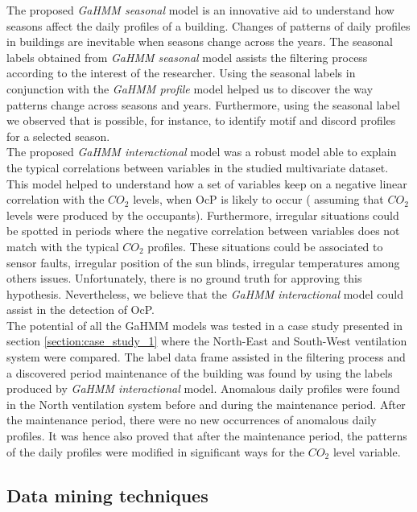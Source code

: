 The proposed \textit{GaHMM seasonal} model is an innovative aid to understand how seasons affect the daily profiles of a building. Changes of patterns of daily profiles in buildings are inevitable when seasons change across the years. The seasonal labels obtained from \textit{GaHMM seasonal} model assists the filtering process according to the interest of the researcher. Using the seasonal labels in conjunction with the \textit{GaHMM profile} model helped us to discover the way patterns change across seasons and years. Furthermore, using the seasonal label we observed that is possible, for instance, to identify motif and discord profiles for a selected season.  \\

The proposed \textit{GaHMM interactional} model was a robust model able to explain the typical correlations between variables in the studied multivariate dataset. This model helped to understand how a set of variables keep on a negative linear correlation with the $CO_2$ levels, when OcP is likely to occur ( assuming that $CO_2$ levels were produced by the occupants). Furthermore, irregular situations could be spotted in periods where the negative correlation between variables does not match with the typical $CO_2$ profiles. These situations could be associated to sensor faults, irregular position of the sun blinds, irregular temperatures among others issues. Unfortunately, there is no ground truth for approving this hypothesis. Nevertheless, we believe that the \textit{GaHMM interactional} model could assist in the detection of OcP.   \\ 

The potential of all the GaHMM models was tested in a case study presented in section \ref{section:case_study_1} where the North-East and South-West ventilation system were compared. The label data frame assisted in the filtering process and a discovered period maintenance of the building was found by using the labels produced by \textit{GaHMM interactional} model. Anomalous daily profiles were found in the North ventilation system before and during the maintenance period. After the maintenance period, there were no new occurrences of anomalous daily profiles. It was hence also proved that after the maintenance period, the patterns of the daily profiles were modified in significant ways for the $CO_2$ level variable. 

\subsection{Data mining techniques}

